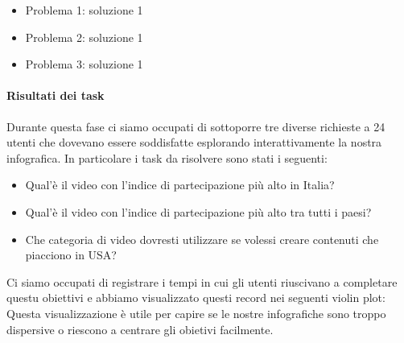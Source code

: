 \documentclass[10pt, a4paper,openany]{article}
\begin{document}
\begin{itemize}
	\item Problema 1: soluzione 1
	\item Problema 2: soluzione 1
	\item Problema 3: soluzione 1
\end{itemize}
\paragraph{Risultati dei task} Durante questa fase ci siamo occupati di sottoporre tre diverse richieste a 24 utenti che dovevano essere soddisfatte esplorando interattivamente la nostra infografica. In particolare i task da risolvere sono stati i seguenti:
\begin{itemize}
	\item Qual'è il video con l'indice di partecipazione più alto in Italia?
	\item Qual'è il video con l'indice di partecipazione più alto tra tutti i paesi?
	\item Che categoria di video dovresti utilizzare se volessi creare contenuti che piacciono in USA?
\end{itemize}Ci siamo occupati di registrare i tempi in cui gli utenti riuscivano a completare questu obiettivi e abbiamo visualizzato questi record nei seguenti violin plot:
Questa visualizzazione è utile per capire se le nostre infografiche sono troppo dispersive o riescono a centrare gli obietivi facilmente.
\end{document}
